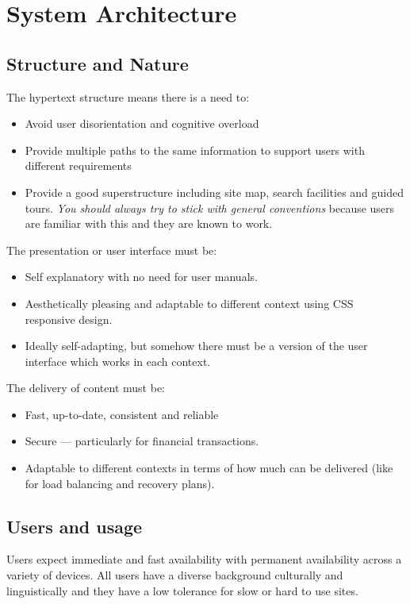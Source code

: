 \section{System Architecture}\label{sec:system_architecture}

\subsection{Structure and Nature}\label{sub:structure_and_nature}

The hypertext structure means there is a need to:
\begin{itemize}
	\item Avoid user disorientation and cognitive overload
	\item Provide multiple paths to the same information to support users with different requirements
	\item Provide a good superstructure including site map, search facilities and guided tours.
	      \emph{You should always try to stick with general conventions} because users are familiar with this and they are known to work.
\end{itemize}
The presentation or user interface must be:
\begin{itemize}
	\item Self explanatory with no need for user manuals.
	\item Aesthetically pleasing and adaptable to different context using CSS responsive design.
	\item Ideally self-adapting, but somehow there must be a version of the user interface which works in each context.
\end{itemize}
The delivery of content must be:
\begin{itemize}
	\item Fast, up-to-date, consistent and reliable
	\item Secure --- particularly for financial transactions.
	\item Adaptable to different contexts in terms of how much can be delivered (like for load balancing and recovery plans).
\end{itemize}

\subsection{Users and usage}\label{sub:users_and_usage}

Users expect immediate and fast availability with permanent availability across a variety of devices.
All users have a diverse background culturally and linguistically and they have a low tolerance for slow or hard to use sites.

